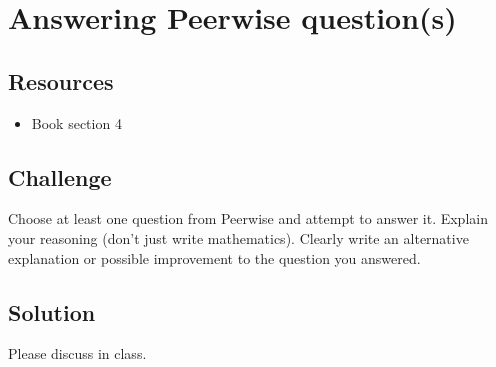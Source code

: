 \newpage
\section{Answering Peerwise question(s)}

\subsection*{Resources}
\begin{itemize}
    \item Book section 4
\end{itemize}

\subsection*{Challenge}
Choose at least one question from Peerwise and attempt to answer it.
Explain your reasoning (don't just write mathematics).
Clearly write an alternative explanation or possible improvement to the question you answered.

\subsection*{Solution}
Please discuss in class.
